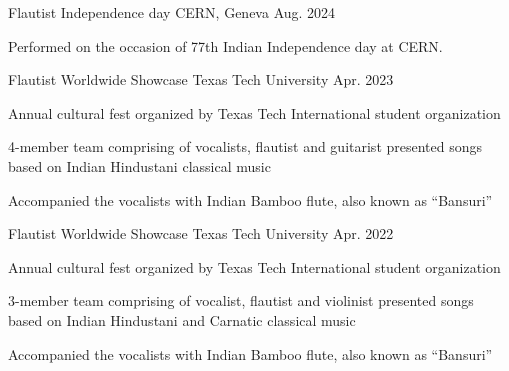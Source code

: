 

\begin{cventries}

  \cventry
    {Flautist} %
    {Independence day} %
    {CERN, Geneva} %
    {Aug. 2024} %
    {
      \begin{cvitems} %
        \item {Performed on the occasion of 77th Indian Independence day at CERN.}
      \end{cvitems}
    }

  \cventry
    {Flautist} %
    {Worldwide Showcase} %
    {Texas Tech University} %
    {Apr. 2023} %
    {
      \begin{cvitems} %
        \item {Annual cultural fest organized by Texas Tech International student organization}
        \item {4-member team comprising of vocalists, flautist and guitarist presented songs based on Indian Hindustani classical music}
        \item {Accompanied the vocalists with Indian Bamboo flute, also known as ``Bansuri''}
      \end{cvitems}
    }

  \cventry
    {Flautist} %
    {Worldwide Showcase} %
    {Texas Tech University} %
    {Apr. 2022} %
    {
      \begin{cvitems} %
        \item {Annual cultural fest organized by Texas Tech International student organization}
        \item {3-member team comprising of vocalist, flautist and violinist presented songs based on Indian Hindustani and Carnatic classical music}
        \item {Accompanied the vocalists with Indian Bamboo flute, also known as ``Bansuri''}
      \end{cvitems}
    }

\end{cventries}
